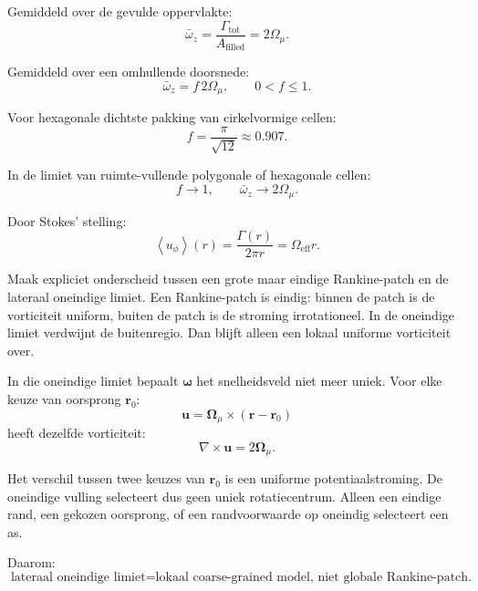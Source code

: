 \documentclass[11pt]{article}
\begin{document}
        Gemiddeld over de gevulde oppervlakte:
        \[
            \bar{\omega}_z
            =
            \frac{\Gamma_{\mathrm{tot}}}{A_{\mathrm{filled}}}
            =
            2\Omega_{\mu}.
        \]
        
        Gemiddeld over een omhullende doorsnede:
        \[
            \bar{\omega}_z=f\,2\Omega_{\mu},
            \qquad
            0<f\leq1.
        \]
        
        Voor hexagonale dichtste pakking van cirkelvormige cellen:
        \[
            f=\frac{\pi}{\sqrt{12}}\approx0.907.
        \]
        
        In de limiet van ruimte-vullende polygonale of hexagonale cellen:
        \[
            f\rightarrow1,
            \qquad
            \bar{\omega}_z\rightarrow2\Omega_{\mu}.
        \]
        
        Door Stokes' stelling:
        \[
            \left\langle u_{\phi}\right\rangle(r)
            =
            \frac{\Gamma(r)}{2\pi r}
            =
            \Omega_{\mathrm{eff}}r.
        \]
        
        Maak expliciet onderscheid tussen een grote maar eindige Rankine-patch en de lateraal oneindige limiet. Een Rankine-patch is eindig: binnen de patch is de vorticiteit uniform, buiten de patch is de stroming irrotationeel. In de oneindige limiet verdwijnt de buitenregio. Dan blijft alleen een lokaal uniforme vorticiteit over.
        
        In die oneindige limiet bepaalt \(\boldsymbol{\omega}\) het snelheidsveld niet meer uniek. Voor elke keuze van oorsprong \(\mathbf{r}_0\):
        \[
            \mathbf{u}
            =
            \boldsymbol{\Omega}_{\mu}
            \times
            (\mathbf{r}-\mathbf{r}_0)
        \]
        heeft dezelfde vorticiteit:
        \[
            \nabla\times\mathbf{u}
            =
            2\boldsymbol{\Omega}_{\mu}.
        \]
        
        Het verschil tussen twee keuzes van \(\mathbf{r}_0\) is een uniforme potentiaalstroming. De oneindige vulling selecteert dus geen uniek rotatiecentrum. Alleen een eindige rand, een gekozen oorsprong, of een randvoorwaarde op oneindig selecteert een as.
        
        Daarom:
        \[
            \boxed{
                \text{lateraal oneindige limiet}
                =
                \text{lokaal coarse-grained model, niet globale Rankine-patch.}
            }
        \]
        
\end{document}
